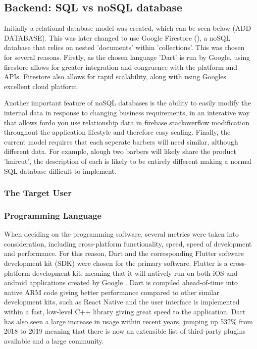 \documentclass[12pt]{article}
\begin{document}
	\subsection{Backend: SQL vs noSQL database}
	Initially a relational database model was created, which can be seen below (ADD DATABASE). This was later changed to use Google Firestore (\cite{firestore}), a noSQL database that relies on  nested 'documents' within 'collections'. This was chosen for several reasons. Firstly, as the chosen language 'Dart' is run by Google, using firestore allows for greater integration and congruence with the platform and APIs. Firestore also allows for rapid scalability, along with using Googles excellent cloud platform.
	
	Another important feature of noSQL databases is the ability to easily modify the internal data in response to changing business requirements, in an interative way that allows fordo you use relationship data in firebase stackoverflow modification throughout the application lifestyle and therefore easy scaling.
	Finally, the current model requires that each seperate barbers will need similar, although different data. For example, alough two barbers will likely share the product 'haircut', the description of each is likely to be entirely different making a normal SQL database difficult to implement.
	
	
	
	\subsubsection{The Target User}
	
	\subsubsection{Programming Language}
	When deciding on the programming software, several metrics were taken into consideration, including cross-platform functionality, speed, speed of development and performance. For this reason, Dart and the corresponding Flutter software development kit (SDK) were chosen for the primary software. Flutter is a cross-platform development kit, meaning that it will natively run on both iOS and android applications created by Google \cite{flutter}. Dart is compiled ahead-of-time into native ARM code giving better performance compared to other similar development kits, such as React Native and the user interface  is implemented within a fast, low-level C++ library giving great speed to the application. Dart has also seen a large increase in usage within recent years, jumping up 532\% from 2018 to 2019 \cite{Github, 2018} meaning that there is now an extensible list of third-party plugins available and a large community.
	
\end{document}
